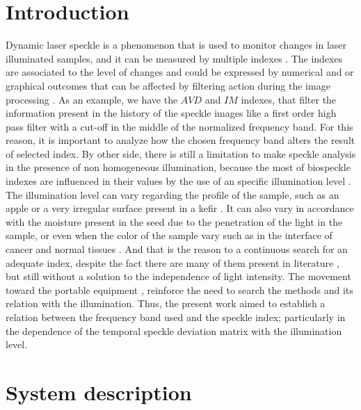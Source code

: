 \documentclass[review]{elsarticle}
\begin{document}
\section{Introduction}
Dynamic laser speckle is a phenomenon that is used to monitor changes in laser illuminated samples, and it can be measured by multiple indexes \cite{BSLTLBOOK}. The indexes are associated to the level of changes and could be expressed by numerical and or graphical outcomes that can be affected by filtering action during the image processing \cite{RIVERA2017144}. As an example, we have  the $AVD$ \cite{avd} and 
$IM$ \cite{ARIZAGA1999163} indexes, that filter
the information present in the history of the speckle images like a first order high pass filter with a cut-off in the middle
of the normalized frequency band. 
For this reason, it is important to analyze how
the chosen frequency band alters the result of selected index.
By other side, there is still a limitation to make speckle analysis in the presence of non homogeneous illumination, because
the most of biospeckle indexes are influenced in their values
by the use of an specific illumination level \cite{REIS2016}.
The illumination level can vary regarding the profile of the sample, such as an apple \cite{KAZ:12a} or a very irregular surface present in a kefir \cite{kefir}. 
It can also vary in accordance with the moisture present in the seed \cite{CARDOSO2011} due to the penetration of the light in the sample, or even when the color of the sample vary such as in the interface of cancer and normal tissues \cite{BCB+:12a}. And that is the reason to a continuous search for an adequate index, despite the fact there are many of them present in literature \cite{BSLTLBOOK}, but still without a solution to the independence of light intensity. 
The movement toward the portable equipment \cite{Bra:17}, reinforce the need to search the methods and its relation with the illumination. 
Thus, the present work aimed to establish a relation between the frequency band used
and the speckle index; particularly in the dependence of
the temporal speckle deviation matrix \cite{Nothdurft:05} with the illumination level.


\section{System description}
\label{sec:description}
\end{document}
